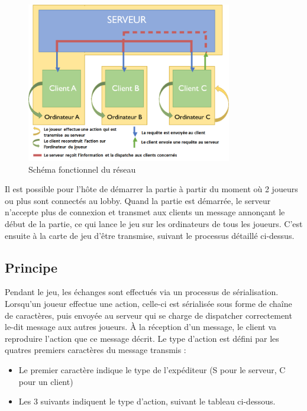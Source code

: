 \documentclass[12pt]{report}
\begin{document}
\begin{figure}[H]
    \centering
    \includegraphics[width=0.8\textwidth]{../report_1/img/multiplayer}
    \caption*{Schéma fonctionnel du réseau}
\end{figure}

Il est possible pour l’hôte de démarrer la partie à partir du moment où 2
joueurs ou plus sont connectés au lobby. Quand la partie est démarrée, le
serveur n’accepte plus de connexion et transmet aux clients un message annonçant
le début de la partie, ce qui lance le jeu sur les ordinateurs de tous les
joueurs. C’est ensuite à la carte de jeu d’être transmise, suivant le processus
détaillé ci-dessus.

\subsection{Principe}

Pendant le jeu, les échanges sont effectués via un processus de sérialisation.
Lorsqu’un joueur effectue une action, celle-ci est sérialisée sous forme de
chaîne de caractères, puis envoyée au serveur qui se charge de dispatcher
correctement le-dit message aux autres joueurs. À la réception d’un message, le
client va reproduire l’action que ce message décrit. Le type d’action est défini
par les quatres premiers caractères du message transmis : 

\begin{itemize}
    \item Le premier caractère indique le type de l’expéditeur (S pour le
        serveur, C pour un client) 
    \item Les 3 suivants indiquent le type d’action, suivant le tableau
        ci-dessous.
\end{itemize}
\end{document}
